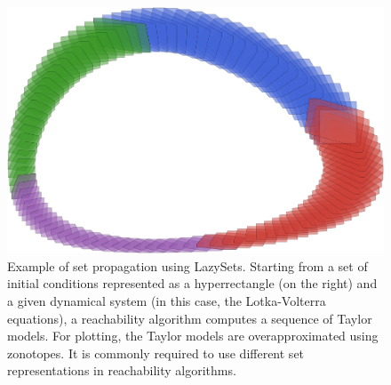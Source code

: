 \begin{figure}[t]
	\centering
	\includegraphics[width=0.7\linewidth, keepaspectratio]{img/lotkavolterra}
	\vspace*{1mm}
	\caption{Example of set propagation using LazySets.
	Starting from a set of initial conditions represented as a hyperrectangle (on the right) and a given dynamical system (in this case, the Lotka-Volterra equations), a reachability algorithm computes a sequence of Taylor models. For plotting, the Taylor models are overapproximated using zonotopes.
	It is commonly required to use different set representations in reachability algorithms.}
	\label{fig:lotka_volterra}
\end{figure}
